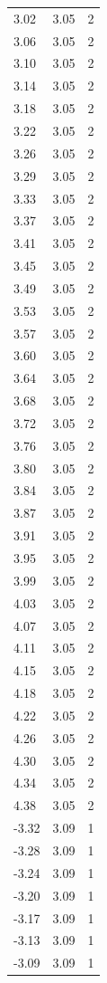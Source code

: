 \begin{longtable}{lrr}
  3.02 & 3.05 & 2 \\
  3.06 & 3.05 & 2 \\
  3.10 & 3.05 & 2 \\
  3.14 & 3.05 & 2 \\
  3.18 & 3.05 & 2 \\
  3.22 & 3.05 & 2 \\
  3.26 & 3.05 & 2 \\
  3.29 & 3.05 & 2 \\
  3.33 & 3.05 & 2 \\
  3.37 & 3.05 & 2 \\
  3.41 & 3.05 & 2 \\
  3.45 & 3.05 & 2 \\
  3.49 & 3.05 & 2 \\
  3.53 & 3.05 & 2 \\
  3.57 & 3.05 & 2 \\
  3.60 & 3.05 & 2 \\
  3.64 & 3.05 & 2 \\
  3.68 & 3.05 & 2 \\
  3.72 & 3.05 & 2 \\
  3.76 & 3.05 & 2 \\
  3.80 & 3.05 & 2 \\
  3.84 & 3.05 & 2 \\
  3.87 & 3.05 & 2 \\
  3.91 & 3.05 & 2 \\
  3.95 & 3.05 & 2 \\
  3.99 & 3.05 & 2 \\
  4.03 & 3.05 & 2 \\
  4.07 & 3.05 & 2 \\
  4.11 & 3.05 & 2 \\
  4.15 & 3.05 & 2 \\
  4.18 & 3.05 & 2 \\
  4.22 & 3.05 & 2 \\
  4.26 & 3.05 & 2 \\
  4.30 & 3.05 & 2 \\
  4.34 & 3.05 & 2 \\
  4.38 & 3.05 & 2 \\
  -3.32 & 3.09 & 1 \\
  -3.28 & 3.09 & 1 \\
  -3.24 & 3.09 & 1 \\
  -3.20 & 3.09 & 1 \\
  -3.17 & 3.09 & 1 \\
  -3.13 & 3.09 & 1 \\
  -3.09 & 3.09 & 1 \\

\end{longtable}
